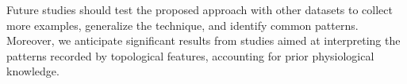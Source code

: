 \documentclass[journal,twoside,web]{ieeecolor2}
\begin{document}
Future studies should test the proposed approach with other datasets to collect more examples, generalize the technique, and identify common patterns. Moreover, we anticipate significant results from studies aimed at interpreting the patterns recorded by topological features, accounting for prior physiological knowledge.

{}

\end{document}
